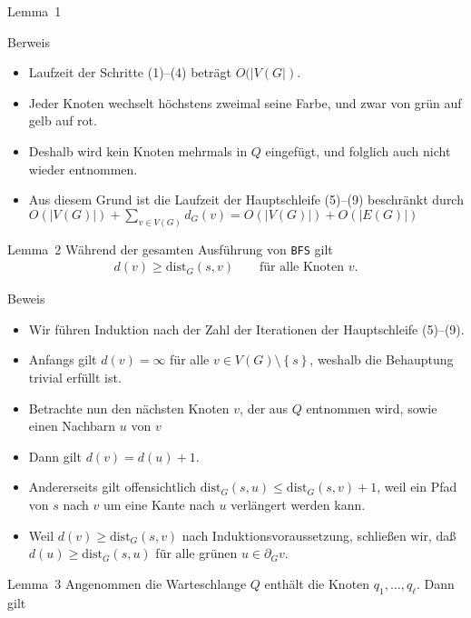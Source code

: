\documentclass[aspectratio=1610, 11pt]{beamer}
\newcommand\dist{\mathrm{dist}}
\newcommand\cbc[1]{\left\{{#1}\right\}}
\begin{document}
\begin{frame}
\begin{overprint}
\begin{block}{Lemma~1}
		\end{block}
		\begin{exampleblock}{Berweis}
			\begin{itemize}
				\item Laufzeit der Schritte (1)--(4) betr\"agt $O(|V(G|)$.
				\item Jeder Knoten wechselt h\"ochstens zweimal seine Farbe, und zwar von gr\"un auf gelb auf rot.
				\item Deshalb wird kein Knoten mehrmals in $Q$ eingef\"ugt, und folglich auch nicht wieder entnommen.
				\item Aus diesem Grund ist die Laufzeit der Hauptschleife (5)--(9) beschr\"ankt durch $O(|V(G)|)+\sum_{v\in V(G)}d_G(v)=O(|V(G)|)+O(|E(G)|)$
			\end{itemize}
		\end{exampleblock}
		\begin{block}{Lemma~2}
			W\"ahrend der gesamten Ausf\"uhrung von {\tt BFS} gilt 
			\begin{align*}
				d(v)\geq\dist_G(s,v)\qquad\mbox{f\"ur alle Knoten $v$}.
			\end{align*}
		\end{block}
		\begin{exampleblock}{Beweis}
			\begin{itemize}
				\item Wir f\"uhren Induktion nach der Zahl der Iterationen der Hauptschleife (5)--(9).
				\item Anfangs gilt $d(v)=\infty$ f\"ur alle $v\in V(G)\setminus\cbc s$, weshalb die Behauptung trivial erf\"ullt ist.
				\item Betrachte nun den n\"achsten Knoten $v$, der aus $Q$ entnommen wird, sowie einen Nachbarn $u$ von $v$
				\item	Dann gilt $d(v)=d(u)+1$.
				\item Andererseits gilt offensichtlich $\dist_G(s,u)\leq\dist_G(s,v)+1$, weil ein Pfad von $s$ nach $v$ um eine Kante nach $u$ verl\"angert werden kann.
				\item Weil $d(v)\geq\dist_G(s,v)$ nach Induktionsvoraussetzung, schlie\ss en wir, da\ss\ $d(u)\geq\dist_G(s,u)$ f\"ur alle gr\"unen $u\in\partial_Gv$.
			\end{itemize}
		\end{exampleblock}
		\begin{block}{Lemma~3}
			Angenommen die Warteschlange $Q$ enth\"alt die Knoten $q_1,\ldots,q_\ell$.
			Dann gilt 
			\begin{align*}

\end{align*}
\end{block}
\end{overprint}
\end{frame}
\end{document}
